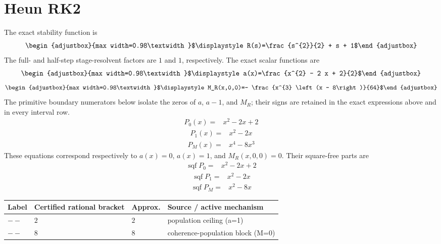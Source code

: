\section{Heun RK2}
The exact stability function is
\[\begin{adjustbox}{max width=0.98\textwidth}$\displaystyle R(s)=\frac{s^{2}}{2} + s + 1$\end{adjustbox}\]
The full- and half-step stage-resolvent factors are $1$ and $1$, respectively.
The exact scalar functions are
\[\begin{adjustbox}{max width=0.98\textwidth}$\displaystyle a(x)=\frac{x^{2} - 2 x + 2}{2}$\end{adjustbox}\]
\[\begin{adjustbox}{max width=0.98\textwidth}$\displaystyle M_R(x,0,0)=- \frac{x^{3} \left(x - 8\right)}{64}$\end{adjustbox}\]
The primitive boundary numerators below isolate the zeros of $a$, $a-1$, and $M_R$; their signs are retained in the exact expressions above and in every interval row.
\[\begin{aligned}
P_0(x)={}&x^{2}-2 x+2
\end{aligned}\]
\[\begin{aligned}
P_1(x)={}&x^{2}-2 x
\end{aligned}\]
\[\begin{aligned}
P_M(x)={}&x^{4}-8 x^{3}
\end{aligned}\]
These equations correspond respectively to $a(x)=0$, $a(x)=1$, and $M_R(x,0,0)=0$. Their square-free parts are
\[\begin{aligned}
\operatorname{sqf}P_0={}&x^{2}-2 x+2
\end{aligned}\]
\[\begin{aligned}
\operatorname{sqf}P_1={}&x^{2}-2 x
\end{aligned}\]
\[\begin{aligned}
\operatorname{sqf}P_M={}&x^{2}-8 x
\end{aligned}\]
\begin{center}
\begin{tabularx}{\textwidth}{@{}l l l X@{}}
\toprule
Label & Certified rational bracket & Approx. & Source / active mechanism \\
\midrule
$--$ & $2$ & $2$ & population ceiling (a=1) \\
$--$ & $8$ & $8$ & coherence-population block (M=0) \\
\bottomrule
\end{tabularx}
\end{center}
